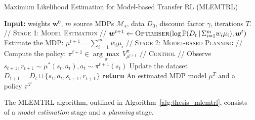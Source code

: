 \begin{algorithm}[t!]
  \caption{Maximum Likelihood Estimation for Model-based Transfer RL (MLEMTRL)}\label{alg:thesis_mlemtrl}
  \begin{algorithmic}[1]
  \State \textbf{Input:} weights $\bm{w}^0$, $m$ source MDPs $\mathcal{M}_s$, data $D_0$, discount factor $\gamma$, iterations $T$.
  \State\textsc{// Stage 1: Model Estimation //}
  \State $\bm{w}^{t+1}\leftarrow  \textsc{Optimiser}(\log\mathbb{P}(D_t \, | \, \Sigma_{i=1}^m w_i \mu_i), \bm{w}^t)$
  \State Estimate the MDP: $\mu^{t+1} = \sum_{i=1}^m w_i \mu_i$
  \State\textsc{// Stage 2: Model-based Planning //}
  \State Compute the policy: $\pi^{t+1} \in \underset{\pi}{\arg\max} \, V_{\mu^{t+1}}^\pi$
  \State\textsc{// Control //}
  \State Observe $s_{t+1}, r_{t+1} \sim \mu^{*}(s_t, a_t), a_t\sim \pi^{t+1}(s_t)$
  \State Update the dataset $D_{t+1} = D_t \cup \{s_t, a_t, s_{t+1}, r_{t+1}\}$
  \EndFor
  \State \textbf{return} An estimated MDP model $\mu^T$ and a policy $\pi^T$
  \end{algorithmic}
\end{algorithm}

The MLEMTRL algorithm, outlined in Algorithm~\ref{alg:thesis_mlemtrl}, consists of a \textit{model estimation} stage and a \textit{planning} stage. 

